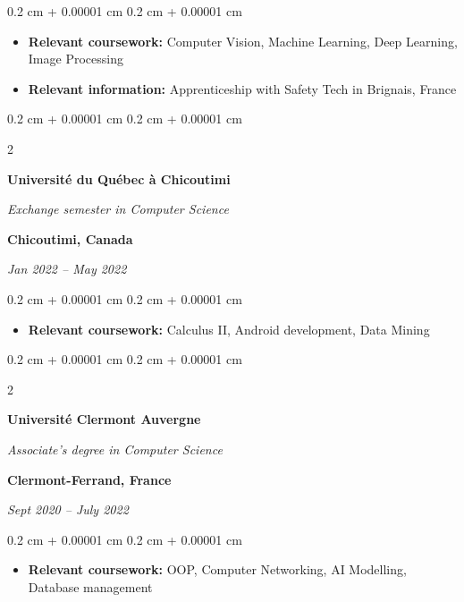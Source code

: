 \documentclass[10pt, letterpaper]{article}
\newenvironment{highlights}{
    \begin{itemize}[
        topsep=0.10 cm,
        parsep=0.10 cm,
        partopsep=0pt,
        itemsep=0pt,
        leftmargin=0.4 cm + 10pt
    ]
}{
    \end{itemize}
} %
\newenvironment{onecolentry}{
    \begin{adjustwidth}{
        0.2 cm + 0.00001 cm
    }{
        0.2 cm + 0.00001 cm
    }
}{
    \end{adjustwidth}
} %
\newenvironment{twocolentry}[2][]{
    \onecolentry
    \def\secondColumn{#2}
    \setcolumnwidth{\fill, 6 cm}
    \begin{paracol}{2}
}{
    \switchcolumn \raggedleft \secondColumn
    \end{paracol}
    \endonecolentry
} %
\begin{document}
        \vspace{0.2 cm}
        \begin{onecolentry}
            \begin{highlights}
                \item \textbf{Relevant coursework:} Computer Vision, Machine Learning, Deep Learning, Image Processing
                \item \textbf{Relevant information:} Apprenticeship with Safety Tech in Brignais, France
            \end{highlights}
        \end{onecolentry}

		\vspace{0.6 cm}
		\begin{twocolentry}{
			\textbf{Chicoutimi, Canada}

			\textit{Jan 2022 – May 2022}}
            \textbf{Université du Québec à Chicoutimi}

            \textit{Exchange semester in Computer Science}
        \end{twocolentry}

        \vspace{0.2 cm}
        \begin{onecolentry}
            \begin{highlights}
                \item \textbf{Relevant coursework:} Calculus II, Android development, Data Mining
            \end{highlights}
        \end{onecolentry}

		\vspace{0.6 cm}
		\begin{twocolentry}{
			\textbf{Clermont-Ferrand, France}

			\textit{Sept 2020 – July 2022}}
            \textbf{Université Clermont Auvergne}

            \textit{Associate's degree in Computer Science}
        \end{twocolentry}

        \vspace{0.2 cm}
        \begin{onecolentry}
            \begin{highlights}
                \item \textbf{Relevant coursework:} OOP, Computer Networking, AI Modelling, Database management
            \end{highlights}
        \end{onecolentry}
\end{document}
